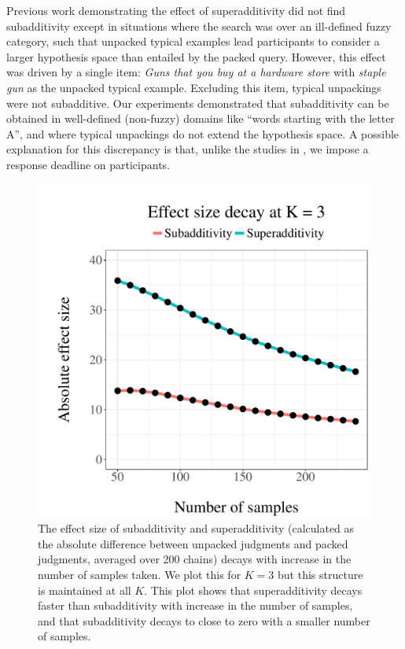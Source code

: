 Previous work demonstrating the effect of superadditivity \citep{super} did not find subadditivity except in situations where the search was over an ill-defined fuzzy category, such that unpacked typical examples lead participants to consider a larger hypothesis space than entailed by the packed query. However, this effect was driven by a single item: \textit{Guns that you buy at a hardware store} with \textit{staple gun} as the unpacked typical example. Excluding this item, typical unpackings were not subadditive. Our experiments demonstrated that subadditivity can be obtained in well-defined (non-fuzzy) domains like ``words starting with the letter A'', and where typical unpackings do not extend the hypothesis space. A possible explanation for this discrepancy is that, unlike the studies in \cite{super}, we impose a response deadline on participants. 
\begin{figure}
\centering
\includegraphics[scale = 0.5]{figures/compare3.pdf}
\caption{The effect size of subadditivity and superadditivity (calculated as the absolute difference between unpacked judgments and packed judgments, averaged over 200 chains) decays with increase in the number of samples taken. We plot this for $K = 3$ but this structure is maintained at all $K$. This plot shows that superadditivity decays faster than subadditivity with increase in the number of samples, and that subadditivity decays to close to zero with a smaller number of samples.}
\label{fig:decay}
\end{figure}
